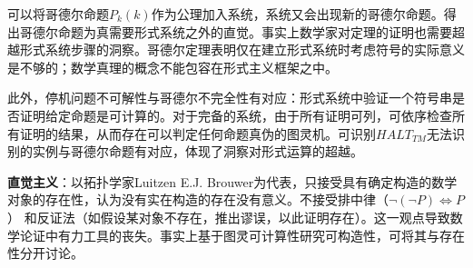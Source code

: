 \par 可以将哥德尔命题$P_k(k)$作为公理加入系统，系统又会出现新的哥德尔命题。得出哥德尔命题为真需要形式系统之外的直觉。事实上数学家对定理的证明也需要超越形式系统步骤的洞察。哥德尔定理表明仅在建立形式系统时考虑符号的实际意义是不够的；数学真理的概念不能包容在形式主义框架之中。

\par 此外，停机问题不可解性与哥德尔不完全性有对应：形式系统中验证一个符号串是否证明给定命题是可计算的。对于完备的系统，由于所有证明可列，可依序检查所有证明的结果，从而存在可以判定任何命题真伪的图灵机。可识别$HALT_{TM}$无法识别的实例与哥德尔命题有对应，体现了洞察对形式运算的超越。

\par \textbf{直觉主义}：以拓扑学家Luitzen E.J. Brouwer为代表，只接受具有确定构造的数学对象的存在性，认为没有实在构造的存在没有意义。不接受排中律（$\lnot (\lnot P) \iff P$） 和反证法（如假设某对象不存在，推出谬误，以此证明存在）。这一观点导致数学论证中有力工具的丧失。事实上基于图灵可计算性研究可构造性，可将其与存在性分开讨论。

 
